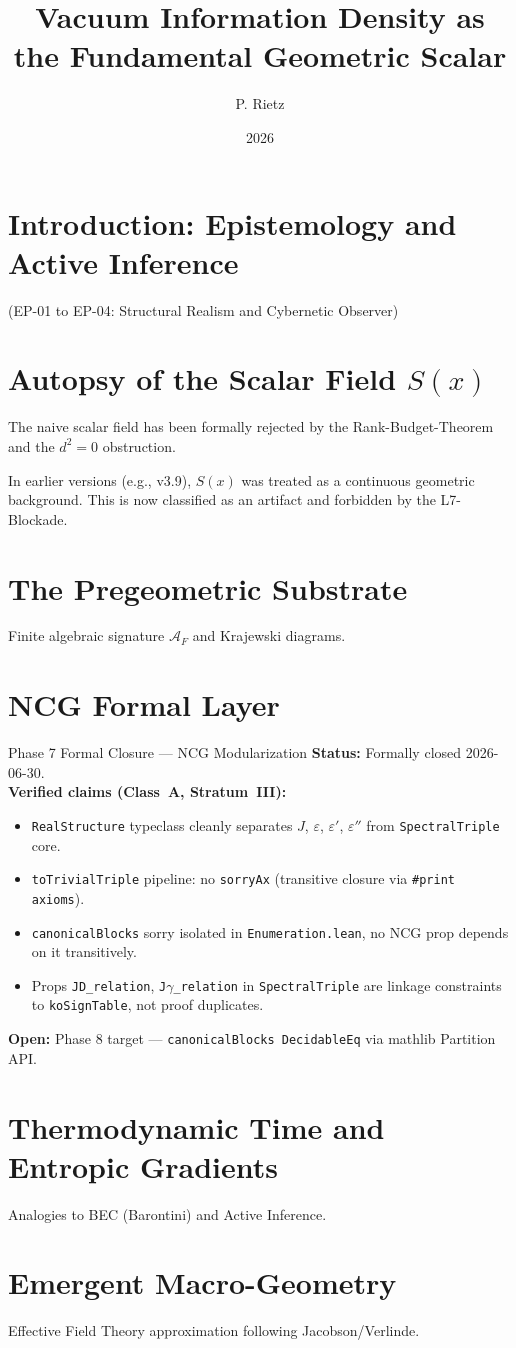\documentclass{article}
\title{Vacuum Information Density as the Fundamental Geometric Scalar}
\author{P. Rietz}
\date{2026}
\begin{document}
\maketitle

\section{Introduction: Epistemology and Active Inference}
(EP-01 to EP-04: Structural Realism and Cybernetic Observer)

\section{Autopsy of the Scalar Field $S(x)$}
The naive scalar field has been formally rejected by the Rank-Budget-Theorem and the $d^2=0$ obstruction.

\begin{museumbox}
In earlier versions (e.g., v3.9), $S(x)$ was treated as a continuous geometric background. This is now classified as an artifact and forbidden by the L7-Blockade.
\end{museumbox}

\section{The Pregeometric Substrate}
Finite algebraic signature $\mathcal{A}_F$ and Krajewski diagrams.

\section{NCG Formal Layer}
\begin{governancebox}{Phase 7 Formal Closure — NCG Modularization}
\textbf{Status:} Formally closed 2026-06-30.\\[0.4em]
\textbf{Verified claims (Class~A, Stratum~III):}
\begin{itemize}
  \item \texttt{RealStructure} typeclass cleanly separates $J$, $\varepsilon$, 
        $\varepsilon'$, $\varepsilon''$ from \texttt{SpectralTriple} core.
  \item \texttt{toTrivialTriple} pipeline: no \texttt{sorryAx} 
        (transitive closure via \texttt{\#print axioms}).
  \item \texttt{canonicalBlocks} sorry isolated in \texttt{Enumeration.lean},
        no NCG prop depends on it transitively.
  \item Props \texttt{JD\_relation}, \texttt{J$\gamma$\_relation} in 
        \texttt{SpectralTriple} are linkage constraints to \texttt{koSignTable},
        not proof duplicates.
\end{itemize}
\textbf{Open:} Phase 8 target — \texttt{canonicalBlocks DecidableEq} 
via mathlib Partition API.
\end{governancebox}

\section{Thermodynamic Time and Entropic Gradients}
Analogies to BEC (Barontini) and Active Inference.

\section{Emergent Macro-Geometry}
Effective Field Theory approximation following Jacobson/Verlinde.
\end{document}
